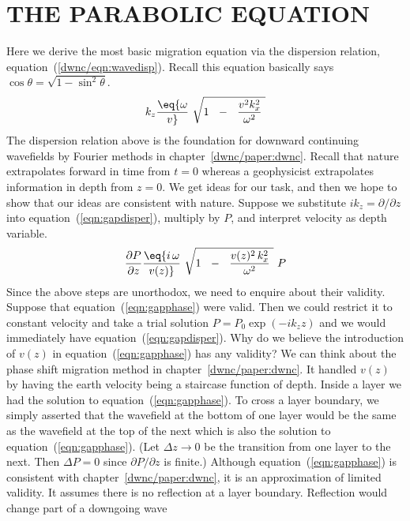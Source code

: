 \section{THE PARABOLIC EQUATION}
Here we derive the most basic migration equation
via the dispersion relation,
equation~(\ref{dwnc/eqn:wavedisp}).
Recall this equation basically says $\cos\theta=\sqrt{1-\sin^2\theta}$.
\begin{equation}
k_z  \eq 
{ \omega     \over v} \
\sqrt{
        1  \ \ -\ \  {v^2k_x^2 \over   \omega^2 } \ 
        }
\label{eqn:gapdisper}
\end{equation}
The dispersion relation above is the foundation
for downward continuing wavefields by Fourier
methods in chapter~\ref{dwnc/paper:dwnc}.
Recall that nature extrapolates forward in time from $t=0$
whereas a geophysicist extrapolates information
in depth from $z=0$.
We get ideas for our task,
and then we hope to show that our ideas are
consistent with nature.
Suppose we substitute $ik_z=\partial/\partial z$
into equation~(\ref{eqn:gapdisper}), multiply by $P$,
and interpret velocity as depth variable.
\begin{equation}
{\partial P   \over  \partial z }  \eq 
{ i \, \omega     \over v(z)} \
\sqrt{
        1  \ \ -\ \  {v(z)^2\, k_x^2 \over   \omega^2 } \ 
        }
\ P
\label{eqn:gapphase}
\end{equation}
Since the above steps are unorthodox,
we need to enquire about their validity.
Suppose that equation~(\ref{eqn:gapphase}) were valid.
Then we could restrict it to constant velocity
and take a trial solution $P=P_0\exp(-ik_z z)$ and we
would immediately have equation~(\ref{eqn:gapdisper}).
Why do we believe the introduction of $v(z)$ in
equation~(\ref{eqn:gapphase}) has any validity?
We can think about the phase shift migration method
in chapter~\ref{dwnc/paper:dwnc}.
It handled $v(z)$ by having the earth velocity
being a staircase function of depth.
Inside a layer we had the solution to
equation~(\ref{eqn:gapphase}).
To cross a layer boundary,
we simply asserted that the wavefield at the bottom
of one layer would be the same as the wavefield
at the top of the next
which is also the solution to
equation~(\ref{eqn:gapphase}).
(Let $\Delta z \rightarrow 0$
be the transition from one layer to the next.
Then $\Delta P=0$ since $\partial P/\partial z$ is finite.)
Although equation~(\ref{eqn:gapphase}) is consistent
with chapter~\ref{dwnc/paper:dwnc},
it is an approximation of limited validity.
It assumes there is no reflection at a layer boundary.
Reflection would change part of a downgoing wave
